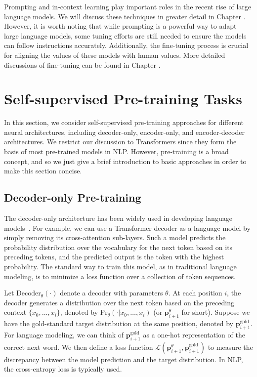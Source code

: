 Prompting and in-context learning play important roles in the recent rise of large language models. We will discuss these techniques in greater detail in Chapter \ChapterLLMPrompting. However, it is worth noting that while prompting is a powerful way to adapt large language models, some tuning efforts are still needed to ensure the models can follow instructions accurately. Additionally, the fine-tuning process is crucial for aligning the values of these models with human values. More detailed discussions of fine-tuning can be found in Chapter \ChapterLLMTuning.

\section{Self-supervised Pre-training Tasks}

\noindent In this section, we consider self-supervised pre-training approaches for different neural architectures, including decoder-only, encoder-only, and encoder-decoder architectures. We restrict our discussion to Transformers since they form the basis of most pre-trained models in NLP. However, pre-training is a broad concept, and so we just give a brief introduction to basic approaches in order to make this section concise.

\subsection{Decoder-only Pre-training}
\label{sec:decoder-only-pre-training}

\noindent The decoder-only architecture has been widely used in developing language models~\cite{radford-etal:2018improving}. For example, we can use a Transformer decoder as a language model by simply removing its cross-attention sub-layers. Such a model predicts the probability distribution over the vocabulary for the next token based on its preceding tokens, and the predicted output is the token with the highest probability. The standard way to train this model, as in traditional language modeling, is to minimize a loss function over a collection of token sequences.

Let $\mathrm{Decoder}_{\theta}(\cdot)$ denote a decoder with parameters $\theta$. At each position $i$, the decoder generates a distribution over the next token based on the preceding context $\{x_0, \dots, x_i\}$, denoted by $\mathrm{Pr}_{\theta}(\cdot|x_0, \dots, x_i)$ (or $\mathbf{p}_{i+1}^{\theta}$ for short). Suppose we have the gold-standard target distribution at the same position, denoted by $\mathbf{p}_{i+1}^{\mathrm{gold}}$. For language modeling, we can think of $\mathbf{p}_{i+1}^{\mathrm{gold}}$ as a one-hot representation of the correct next word. We then define a loss function $\mathcal{L}(\mathbf{p}_{i+1}^{\theta}, \mathbf{p}_{i+1}^{\mathrm{gold}})$ to measure the discrepancy between the model prediction and the target distribution. In NLP, the cross-entropy loss is typically used.

